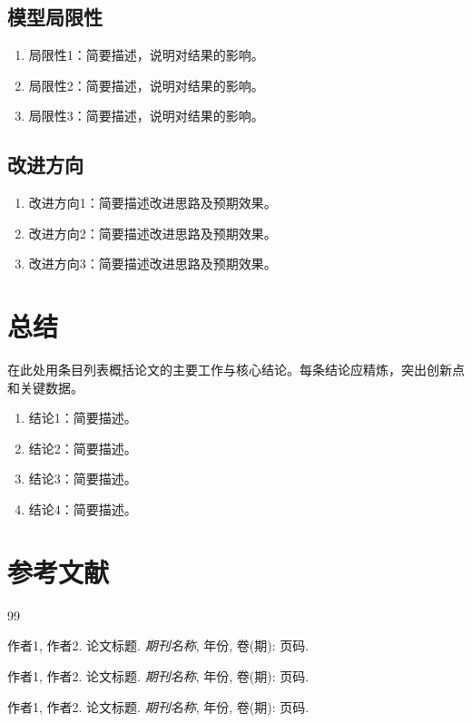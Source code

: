 \documentclass[12pt,a4paper]{article}
\begin{document}
\subsection{模型局限性}

\begin{enumerate}
    \item 局限性1：简要描述，说明对结果的影响。
    \item 局限性2：简要描述，说明对结果的影响。
    \item 局限性3：简要描述，说明对结果的影响。
\end{enumerate}

\subsection{改进方向}

\begin{enumerate}
    \item 改进方向1：简要描述改进思路及预期效果。
    \item 改进方向2：简要描述改进思路及预期效果。
    \item 改进方向3：简要描述改进思路及预期效果。
\end{enumerate}

\section{总结}

在此处用条目列表概括论文的主要工作与核心结论。每条结论应精炼，突出创新点和关键数据。

\begin{enumerate}
    \item 结论1：简要描述。
    \item 结论2：简要描述。
    \item 结论3：简要描述。
    \item 结论4：简要描述。
\end{enumerate}

\section{参考文献}

\begin{thebibliography}{99}

作者1, 作者2. 论文标题. \textit{期刊名称}, 年份, 卷(期): 页码.

作者1, 作者2. 论文标题. \textit{期刊名称}, 年份, 卷(期): 页码.

作者1, 作者2. 论文标题. \textit{期刊名称}, 年份, 卷(期): 页码.

\end{thebibliography}
\end{document}
